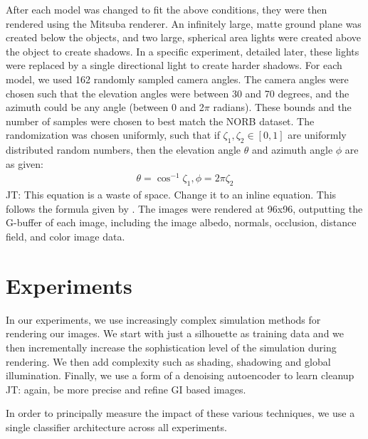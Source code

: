 \documentclass[10pt,twocolumn,letterpaper]{article}
\newcommand{\tompson}[1]{{\color{green} JT: #1}}
\begin{document}
After each model was changed to fit the above conditions, they were then rendered using the Mitsuba renderer. An infinitely large, matte ground plane was created below the objects, and two large, spherical area lights were created above the object to create shadows. In a specific experiment, detailed later, these lights were replaced by a single directional light to create harder shadows. For each model, we used 162 randomly sampled camera angles. The camera angles were chosen such that the elevation angles were between 30 and 70 degrees, and the azimuth could be any angle (between 0 and 2$\pi$ radians). These bounds and the number of samples were chosen to best match the NORB dataset. The randomization was chosen uniformly, such that if $\zeta_1,\zeta_2\in[0,1]$ are uniformly distributed random numbers, then the elevation angle $\theta$ and azimuth angle $\phi$ are as given:
\begin{align*}
\theta = \cos^{-1}\zeta_1, \phi = 2\pi \zeta_2
\end{align*}
\tompson{This equation is a waste of space. Change it to an inline equation.}
This follows the formula given by \cite{Pharr:2010:PBR:1854996}. The images were rendered at 96x96, outputting the G-buffer of each image, including the image albedo, normals, occlusion, distance field, and color image data.

\section{Experiments}
In our experiments, we use increasingly complex simulation methods for rendering our images.  We start with just a silhouette as training data and we then incrementally increase the sophistication level of the simulation during rendering.  We then add complexity such as shading, shadowing and global illumination. Finally, we use a form of a denoising autoencoder to learn cleanup \tompson{again, be more precise} and refine GI based images.

In order to principally measure the impact of these various techniques, we use a single classifier architecture across all experiments.
\end{document}
